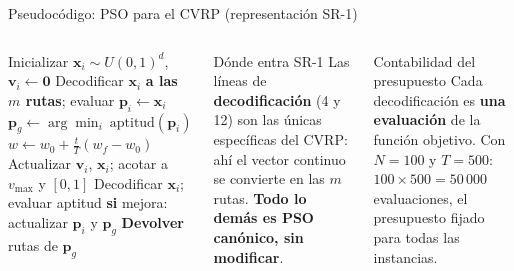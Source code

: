 \documentclass[aspectratio=169, 11pt, xcolor={dvipsnames,table}]{beamer}
\newcommand{\azul}[1]{\textcolor{UsachAzul}{#1}}
\newcommand{\xx}{\mathbf{x}_i}
\newcommand{\vv}{\mathbf{v}_i}
\newcommand{\pp}{\mathbf{p}_i}
\newcommand{\pg}{\mathbf{p}_g}
\begin{document}
\begin{frame}{Pseudocódigo: PSO para el CVRP (representación SR-1)}
\begin{columns}[T]
\begin{algorithm}[H]
\tiny
\begin{algorithmic}[1]
  \State Inicializar $\xx \sim U(0,1)^d$, \ $\vv \gets \mathbf{0}$
    \State Decodificar $\xx$ \textbf{a las $m$ rutas}; evaluar
    \State $\pp \gets \xx$
  \EndFor
  \State $\pg \gets \arg\min_i \ \text{aptitud}(\pp)$
    \State $w \gets w_0 + \tfrac{t}{T}(w_f - w_0)$
      \State Actualizar $\vv$, $\xx$; acotar a $v_{\max}$ y $[0,1]$
      \State Decodificar $\xx$; evaluar aptitud
      \State \textbf{si} mejora: actualizar $\pp$ y $\pg$
    \EndFor
  \EndFor
  \State \textbf{Devolver} rutas de $\pg$
\EndProcedure
\end{algorithmic}
\end{algorithm}
\begin{block}{Dónde entra SR-1}
\scriptsize
Las líneas de \textbf{decodificación} (4 y 12) son las \azul{únicas} específicas del CVRP:
ahí el vector continuo se convierte en las $m$ rutas. \textbf{Todo lo demás es PSO
canónico, sin modificar}.
\end{block}
\begin{alertblock}{Contabilidad del presupuesto}
\scriptsize
Cada decodificación es \textbf{una evaluación} de la función objetivo. Con
$N{=}100$ y $T{=}500$: $100 \times 500 = 50\,000$ evaluaciones, el presupuesto fijado
para todas las instancias.
\end{alertblock}
\end{columns}
\end{frame}
\end{document}
